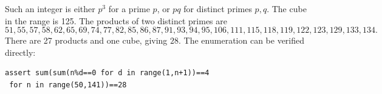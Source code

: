 Such an integer is either $ p^3 $ for a prime $ p $, or $ pq $ for distinct primes $ p,q $. The cube in the range is 125. The products of two distinct primes are
 \[51,55,57,58,62,65,69,74,77,82,85,86,87,91,93,94,95,106,111,115,118,119,122,123,129,133,134.\]
There are 27 products and one cube, giving $\boxed{28}$. The enumeration can be verified directly:
\begin{verbatim}
assert sum(sum(n%d==0 for d in range(1,n+1))==4
 for n in range(50,141))==28
\end{verbatim}
